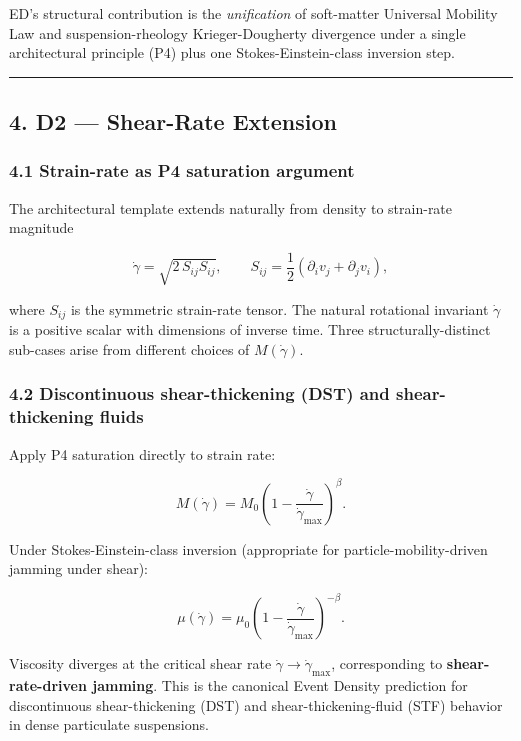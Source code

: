 \documentclass[
  11pt,a4paper]{article}
\begin{document}
ED's structural contribution is the \emph{unification} of soft-matter
Universal Mobility Law and suspension-rheology Krieger-Dougherty
divergence under a single architectural principle (P4) plus one
Stokes-Einstein-class inversion step.

\begin{center}\rule{0.5\linewidth}{0.5pt}\end{center}

\subsection{4. D2 --- Shear-Rate
Extension}\label{d2-shear-rate-extension}

\subsubsection{4.1 Strain-rate as P4 saturation
argument}\label{strain-rate-as-p4-saturation-argument}

The architectural template extends naturally from density to strain-rate
magnitude

\[\dot\gamma = \sqrt{2 \, S_{ij} S_{ij}}, \qquad S_{ij} = \frac{1}{2}(\partial_i v_j + \partial_j v_i),\]

where \(S_{ij}\) is the symmetric strain-rate tensor. The natural
rotational invariant \(\dot\gamma\) is a positive scalar with dimensions
of inverse time. Three structurally-distinct sub-cases arise from
different choices of \(M(\dot\gamma)\).

\subsubsection{4.2 Discontinuous shear-thickening (DST) and
shear-thickening
fluids}\label{discontinuous-shear-thickening-dst-and-shear-thickening-fluids}

Apply P4 saturation directly to strain rate:

\[M(\dot\gamma) = M_0 \left(1 - \frac{\dot\gamma}{\dot\gamma_\mathrm{max}}\right)^\beta.\]

Under Stokes-Einstein-class inversion (appropriate for
particle-mobility-driven jamming under shear):

\[\mu(\dot\gamma) = \mu_0 \left(1 - \frac{\dot\gamma}{\dot\gamma_\mathrm{max}}\right)^{-\beta}.\]

Viscosity diverges at the critical shear rate
\(\dot\gamma \to \dot\gamma_\mathrm{max}\), corresponding to
\textbf{shear-rate-driven jamming}. This is the canonical Event Density
prediction for discontinuous shear-thickening (DST) and
shear-thickening-fluid (STF) behavior in dense particulate suspensions.
\end{document}
